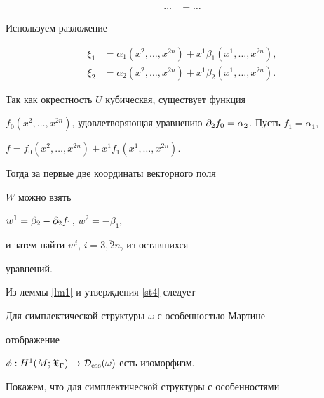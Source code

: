 \begin{pf}
\begin{align*}
\dotsc &= \dotsc


\end{align*}


Используем разложение


\begin{align*}


\xi_1 &= \alpha_1(x^2, \dotsc, x^{2n})


+ x^1 \beta_1(x^1, \dotsc,x^{2n}),


\\


\xi_2 &= \alpha_2(x^2, \dotsc, x^{2n})


+ x^1 \beta_2(x^1, \dotsc,x^{2n}).


\end{align*}


Так как окрестность $U$ кубическая, существует функция


$f_0(x^2, \dots, x^{2n})$, удовлетворяющая уравнению  $\pd_2 f_0 =


\alpha_2$. Пусть $f_1=\alpha_1$,


$f = f_0(x^2, \dotsc, x^{2n}) + x^1 f_1(x^1, \dotsc,x^{2n})$.


Тогда за первые две координаты векторного поля


$W$ можно взять


$w^1 = \beta_2 - {\partial}_2 f_1$, $w^2 = -\beta_1$,


и затем найти  $w^i$, $i=\overline{3,2n}$, из оставшихся


уравнений.


\end{pf}





Из леммы \ref{lm1} и утверждения \ref{st4} следует





\begin{stat}\label{st5}


Для симплектической структуры $\omega$ с особенностью Мартине


отображение


$\phi: H^1(M;{\frak X}_\Gamma) \to {\cal D}_{\operatorname{ess}}(\omega)$ есть изоморфизм.


\end{stat}








Покажем, что для симплектической структуры с особенностями


